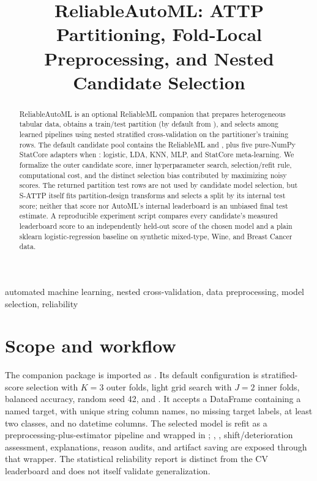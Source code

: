 ﻿\documentclass[conference]{IEEEtran}
\title{ReliableAutoML: ATTP Partitioning, Fold-Local Preprocessing, and Nested Candidate Selection}
\author{\jabulaniauthor\and\martinchanzauthor\and\oloratoauthor\and\mfundoauthor}
\begin{document}
\maketitle
\begin{abstract}
ReliableAutoML is an optional ReliableML companion that prepares heterogeneous tabular data, obtains a train/test partition (by default from ), and selects among learned pipelines using nested stratified cross-validation on the partitioner's training rows. The default candidate pool contains the ReliableML  and , plus five pure-NumPy StatCore adapters when : logistic, LDA, KNN, MLP, and StatCore meta-learning. We formalize the outer candidate score, inner hyperparameter search, selection/refit rule, computational cost, and the distinct selection bias contributed by maximizing noisy scores. The returned partition test rows are not used by candidate model selection, but S-ATTP itself fits partition-design transforms and selects a split by its internal test score; neither that score nor AutoML's internal leaderboard is an unbiased final test estimate. A reproducible experiment script compares every candidate's measured leaderboard score to an independently held-out score of the chosen model and a plain sklearn logistic-regression baseline on synthetic mixed-type, Wine, and Breast Cancer data.
\end{abstract}
\begin{IEEEkeywords}
automated machine learning, nested cross-validation, data preprocessing, model selection, reliability
\end{IEEEkeywords}

\section{Scope and workflow}
The companion package is imported as . Its default configuration is stratified-score selection with \(K=3\) outer folds, light grid search with \(J=2\) inner folds, balanced accuracy, random seed 42, and . It accepts a DataFrame containing a named target, with unique string column names, no missing target labels, at least two classes, and no datetime columns. The selected model is refit as a preprocessing-plus-estimator pipeline and wrapped in ; , , shift/deterioration assessment, explanations, reason audits, and artifact saving are exposed through that wrapper. The statistical reliability report is distinct from the CV leaderboard and does not itself validate generalization.
\end{document}
